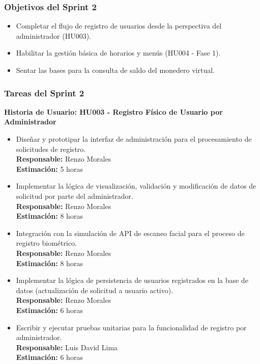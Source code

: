\documentclass[12pt]{article}
\begin{document}
\subsubsection{Objetivos del Sprint 2}
\begin{itemize}
	\item Completar el flujo de registro de usuarios desde la perspectiva del administrador (HU003).
	\item Habilitar la gestión básica de horarios y menús (HU004 - Fase 1).
	\item Sentar las bases para la consulta de saldo del monedero virtual.
\end{itemize}

\subsubsection{Tareas del Sprint 2}
\textbf{Historia de Usuario: HU003 - Registro Físico de Usuario por Administrador}
\begin{itemize}
	\item Diseñar y prototipar la interfaz de administración para el procesamiento de solicitudes de registro. \\
	\textbf{Responsable:} Renzo Morales \\
	\textbf{Estimación:} 5 horas
	\item Implementar la lógica de visualización, validación y modificación de datos de solicitud por parte del administrador. \\
	\textbf{Responsable:} Renzo Morales \\
	\textbf{Estimación:} 8 horas
	\item Integración con la simulación de API de escaneo facial para el proceso de registro biométrico. \\
	\textbf{Responsable:} Renzo Morales \\
	\textbf{Estimación:} 8 horas
	\item Implementar la lógica de persistencia de usuarios registrados en la base de datos (actualización de solicitud a usuario activo). \\
	\textbf{Responsable:} Renzo Morales \\
	\textbf{Estimación:} 6 horas
	\item Escribir y ejecutar pruebas unitarias para la funcionalidad de registro por administrador. \\
	\textbf{Responsable:} Luis David Lima \\
	\textbf{Estimación:} 6 horas
\end{itemize}
\end{document}

